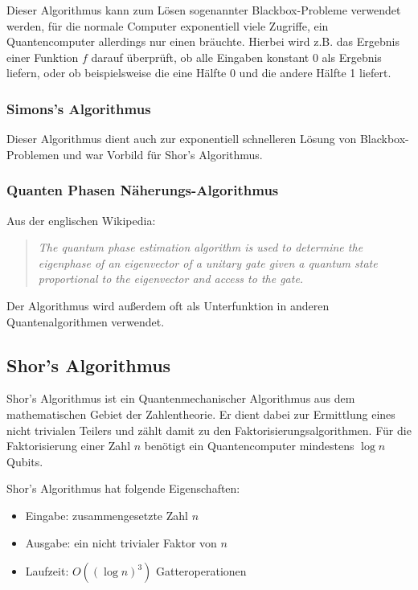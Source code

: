 Dieser Algorithmus kann zum Lösen sogenannter Blackbox-Probleme verwendet werden, für die normale Computer exponentiell viele Zugriffe, ein Quantencomputer allerdings nur einen bräuchte.
Hierbei wird z.B. das Ergebnis einer Funktion $f$ darauf überprüft, ob alle Eingaben konstant 0 als Ergebnis liefern, oder ob beispielsweise die eine Hälfte 0 und die andere Hälfte 1 liefert. \cite{quantenalgorithmgwiki}


\subsubsection{Simons's Algorithmus}

Dieser Algorithmus dient auch zur exponentiell schnelleren Lösung von Blackbox-Problemen und war Vorbild für Shor's Algorithmus. \cite{quantenalgorithmgwiki}

\subsubsection{Quanten Phasen Näherungs-Algorithmus}

Aus der englischen Wikipedia:\cite{quantenalgorithmgwiki}
\begin{quote}
    \textit{The quantum phase estimation algorithm is used to determine the eigenphase of an eigenvector of a unitary gate given a quantum state proportional to the eigenvector and access to the gate.}
\end{quote}
Der Algorithmus wird außerdem oft als Unterfunktion in anderen Quantenalgorithmen verwendet. 


\subsection{Shor's Algorithmus}
\label{sec:Shor's Algorithmus}

Shor's Algorithmus ist ein Quantenmechanischer Algorithmus aus dem mathematischen Gebiet der Zahlentheorie.
Er dient dabei zur Ermittlung eines nicht trivialen Teilers und zählt damit zu den Faktorisierungsalgorithmen.
Für die Faktorisierung einer Zahl $n$ benötigt ein Quantencomputer mindestens $\log{n}$ Qubits.

\newpage

Shor's Algorithmus hat folgende Eigenschaften: \cite{shorwiki}

\begin{itemize}
    \item Eingabe:  zusammengesetzte Zahl $n$
    \item Ausgabe:  ein nicht trivialer Faktor von $n$
    \item Laufzeit: $O((\log{n})^3)$ Gatteroperationen 
\end{itemize}

